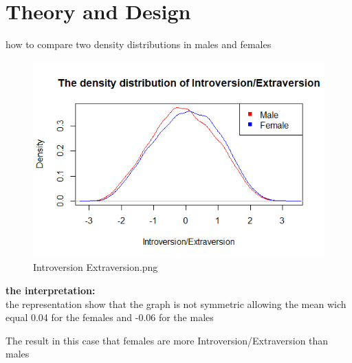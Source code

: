 \section{Theory and Design}

how to compare two density distributions in males and females



\begin{figure}[]
\setlength{\abovecaptionskip}{-4pt}
\begin{center}
\includegraphics{Introversion_Extraversion.png}
  \caption{Introversion Extraversion.png}
  \end{center}
\end{figure}

{\normalsize{\bf the interpretation:}} \\\vspace{0.5cm}
the representation show that the graph is not symmetric allowing 
the mean wich equal 0.04  for the females and -0.06  for the males 

The result in this case that females are more Introversion/Extraversion than males



